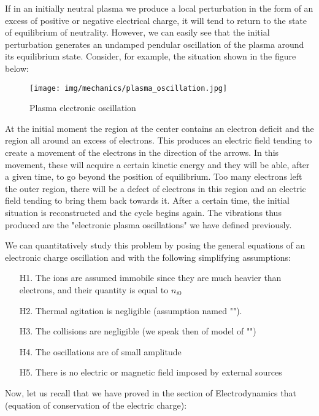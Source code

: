 	If in an initially neutral plasma we produce a local perturbation in the form of an excess of positive or negative electrical charge, it will tend to return to the state of equilibrium of neutrality. However, we can easily see that the initial perturbation generates an undamped pendular oscillation of the plasma around its equilibrium state. Consider, for example, the situation shown in the figure below:
	\begin{figure}[H]
		\centering
		\texttt{[image: img/mechanics/plasma\_oscillation.jpg]}
		\caption{Plasma electronic oscillation}
	\end{figure}
	At the initial moment the region at the center contains an electron deficit and the region all around an excess of electrons. This produces an electric field tending to create a movement of the electrons in the direction of the arrows. In this movement, these will acquire a certain kinetic energy and they will be able, after a given time, to go beyond the position of equilibrium. Too many electrons left the outer region, there will be a defect of electrons in this region and an electric field tending to bring them back towards it. After a certain time, the initial situation is reconstructed and the cycle begins again. The vibrations thus produced are the "electronic plasma oscillations" we have defined previously.

	\pagebreak
	We can quantitatively study this problem by posing the general equations of an electronic charge oscillation and with the following simplifying assumptions:
	\begin{enumerate}
		\item[H1.] The ions are assumed immobile since they are much heavier than electrons, and their quantity is equal to $n_{i0}$

		\item[H2.] Thermal agitation is negligible (assumption named "").

		\item[H3.] The collisions are negligible (we speak then of model of "")

		\item[H4.] The oscillations are of small amplitude

		\item[H5.] There is no electric or magnetic field imposed by external sources
	\end{enumerate}
	Now, let us recall that we have proved in the section of Electrodynamics that (equation of conservation of the electric charge):
	
